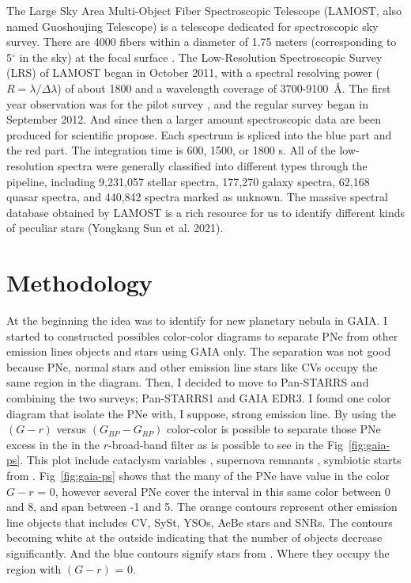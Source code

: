 \documentclass[fleqn,usenatbib]{mnras}
\begin{document}
The Large Sky Area Multi-Object Fiber Spectroscopic Telescope
(LAMOST, also named Guoshoujing Telescope) is a
telescope dedicated for spectroscopic sky survey.
There are 4000 fibers within a diameter of 1.75 meters (corresponding
to 5$^{\circ}$ in the sky) at the focal surface \citep{Cui:2012}.
The Low-Resolution Spectroscopic Survey (LRS) of LAMOST
began in October 2011, with a spectral resolving power ($R = \lambda/\Delta\lambda$)
of about 1800 and a wavelength coverage of
3700-9100~\AA \citep{Zhao:2012}. The first year observation was
for the pilot survey \citep{Luo:2012, Zhao:2012},
and the regular survey began in September 2012. And since then
a larger amount  spectroscopic data are been produced for
scientific propose.
Each spectrum
is spliced into the blue part and the red part. The integration
time is 600, 1500, or 1800 s. All of the low-resolution spectra
were generally classified into different types through the
pipeline, including 9,231,057 stellar spectra, 177,270 galaxy
spectra, 62,168 quasar spectra, and 440,842 spectra marked as
unknown. The massive spectral database obtained by
LAMOST is a rich resource for us to identify different kinds
of peculiar stars (Yongkang Sun et al. 2021).

\section{Methodology}
\label{sec:metho}

At the beginning the idea was to identify for new planetary nebula in GAIA.
I started to constructed possibles color-color diagrams to separate PNe from
other emission lines objects and stars using GAIA only. The separation was not
good because PNe, normal stars and other emission line stars like CVs occupy the same region
in the diagram. Then, I decided to move to Pan-STARRS and combining the two
surveys; Pan-STARRS1 and GAIA EDR3. I found one color diagram that isolate the PNe
with, I suppose, strong \ha{} emission line. By using the \((G - r)\) versus \((G_{BP} - G_{RP})\)
color-color is possible to separate those PNe excess in the in the $r$-broad-band
filter as is possible to see in the Fig~\ref{fig:gaia-ps}. This plot include cataclysm variables
\citep{Downes:2006}, supernova remnants \citep{Green:2019}, symbiotic starts from \citet{Akras:2019a}.  
Fig~\ref{fig:gaia-ps}
shows that the many of the PNe have value in the color \(G - r\) = 0, however several
PNe cover the interval in this same color between 0 and 8, and span between -1 and 5.
The orange contours represent other emission line objects that includes CV, SySt,
YSOs, AeBe stars and SNRs. The contours becoming white at the outside indicating
that the number of objects decrease significantly. And the blue contours signify
stars from \citet{Smart:2021}. Where they occupy the region with \((G - r)\) = 0.
\end{document}
